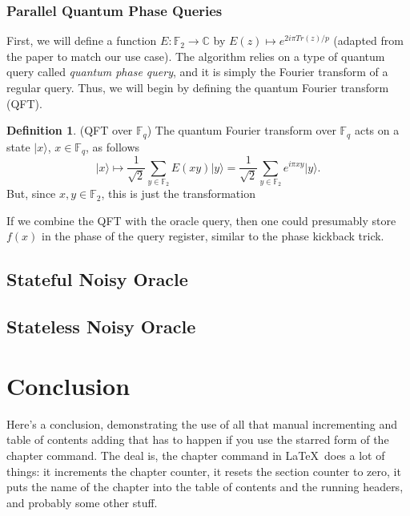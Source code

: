 \documentclass[12pt,twoside]{reedthesis}
\theoremstyle{definition}
\newtheorem{definition}[theorem]{Definition}
\newcommand{\C}{\mathbb{C}}
\newcommand{\F}{\mathbb{F}}
\newcommand{\ket}[1]{\ensuremath{\lvert #1\rangle}\xspace}
\begin{document}
\subsection{Parallel Quantum Phase Queries}
 First, we will define a function $E: \F_2 \rightarrow \C$ by $E(z) \longmapsto e^{2i\pi Tr(z)/p}$ (adapted from the paper to match our use case). The algorithm relies on a type of quantum query called \textit{quantum phase query}, and it is simply the Fourier transform of a regular query. Thus, we will begin by defining the quantum Fourier transform (QFT).
 
\begin{definition}(QFT over $\F_q$) The quantum Fourier transform over $\F_q$ acts on a state $\ket{x}$, $x\in \F_q$, as follows
\begin{equation*}
\ket{x}  \longmapsto \frac{1}{\sqrt{2}}\sum_{y\in \F_2} E(xy)\ket{y}
=  \frac{1}{\sqrt{2}}\sum_{y\in \F_2} e^{i\pi xy}\ket{y}.
\end{equation*}
But, since $x,y \in \F_2$, this is just the transformation
\end{definition}

If we combine the QFT with the oracle query, then one could presumably store $f(x)$ in the phase of the query register, similar to the phase kickback trick. 



\section{Stateful Noisy Oracle}
\section{Stateless Noisy Oracle}

\chapter*{Conclusion}
	\setcounter{chapter}{6}
	\setcounter{section}{0}
	
Here's a conclusion, demonstrating the use of all that manual incrementing and table of contents adding that has to happen if you use the starred form of the chapter command. The deal is, the chapter command in \LaTeX\ does a lot of things: it increments the chapter counter, it resets the section counter to zero, it puts the name of the chapter into the table of contents and the running headers, and probably some other stuff. 
\end{document}
